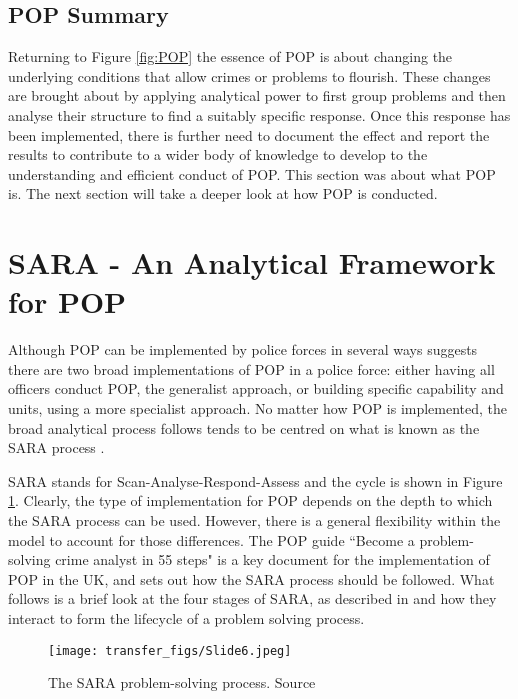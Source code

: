 \subsection{POP Summary} Returning to Figure \ref{fig:POP} the essence of POP is about changing the underlying conditions that allow crimes or problems to flourish. These changes are brought about by applying analytical power to first group problems and then analyse their structure to find a suitably specific response. Once this response has been implemented, there is further need to document the effect and report the results to contribute to a wider body of knowledge to develop to the understanding and efficient conduct of POP. This section was about what POP is. The next section will take a deeper look at how POP is conducted.


\section{SARA  - An Analytical Framework for POP} Although POP can be implemented by police forces in several ways \textcite{scott2012implementing} suggests there are two broad implementations of POP in a police force: either having all officers conduct POP, the generalist approach, or building specific capability and units, using a more specialist approach. No matter how POP is implemented, the broad analytical process follows tends to be centred on what is known as the SARA process  \parencite{POPUCL}. 

SARA stands for Scan-Analyse-Respond-Assess and the cycle is shown in Figure \ref{fig:SARA}.  Clearly, the type of implementation for POP depends on the depth to which the SARA process can be used. However, there is a general flexibility within the model to account for those differences. The POP guide ``Become a problem-solving crime analyst in 55 steps"  \parencite{clarke2003becoming} is a key document for the implementation of POP in the UK, and sets out how the SARA process should be followed. What follows is a brief look at the four stages of SARA, as described in  and how they interact to form the lifecycle of a problem solving process.

\begin{figure}
  \texttt{[image: transfer\_figs/Slide6.jpeg]}
  \caption[The SARA problem-solving process.]{The SARA problem-solving process. Source \textcite{clarke2003becoming}}
  \label{fig:SARA}
\end{figure}


